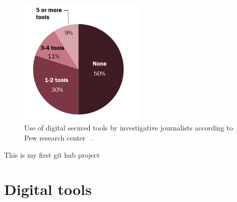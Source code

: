 \begin{figure}[ht!]
 	\centering
 	\includegraphics[width=60mm]{5.png}
 	\caption{Use of digital secured tools by investigative journalists according to Pew research center ~\cite{ia2p}.}
 	\label{fig:4}
 \end{figure}
 
 This is my first git hub project 
 
 
 \section{Digital tools}




